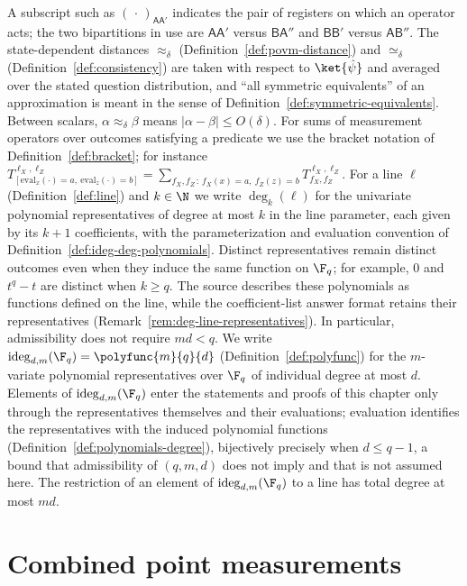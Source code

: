 A subscript such as $(\,\cdot\,)_{\mathsf{A}\mathsf{A}'}$ indicates the pair of
registers on which an operator acts; the two bipartitions in use are
$\mathsf{A}\mathsf{A}'$ versus $\mathsf{B}\mathsf{A}''$ and
$\mathsf{B}\mathsf{B}'$ versus $\mathsf{A}\mathsf{B}''$. The state-dependent
distances $\approx_\delta$ (Definition~\ref{def:povm-distance}) and
$\simeq_\delta$ (Definition~\ref{def:consistency}) are taken with respect to
$\ket{\hat\psi}$ and averaged over the stated question distribution, and
``all symmetric equivalents'' of an approximation is meant in the sense of
Definition~\ref{def:symmetric-equivalents}. Between scalars, $\alpha
\approx_\delta \beta$ means $|\alpha - \beta| \le O(\delta)$. For sums of
measurement operators over outcomes satisfying a predicate we use the bracket
notation of Definition~\ref{def:bracket}; for instance
$T^{\ell_X,\ell_Z}_{[\mathrm{eval}_x(\cdot)=a,\ \mathrm{eval}_z(\cdot)=b]}
= \sum_{f_X,f_Z \,:\, f_X(x)=a,\ f_Z(z)=b} T^{\ell_X,\ell_Z}_{f_X,f_Z}$.
For a line $\ell$ (Definition~\ref{def:line}) and $k \in \N$ we write
$\deg_k(\ell)$ for the univariate polynomial representatives of degree at most
$k$ in the line parameter, each given by its $k+1$ coefficients, with the
parameterization and evaluation convention of
Definition~\ref{def:ideg-deg-polynomials}. Distinct representatives remain
distinct outcomes even when they induce the same function on $\F_q$; for
example, $0$ and $t^q-t$ are distinct when $k\geq q$. The source describes
these polynomials as functions defined on the line, while the coefficient-list
answer format retains their representatives
(Remark~\ref{rem:deg-line-representatives}). In particular, admissibility
does not require $md<q$. We write
$\mathrm{ideg}_{d,m}(\F_q) = \polyfunc{m}{q}{d}$
(Definition~\ref{def:polyfunc}) for the $m$-variate polynomial representatives
over $\F_q$ of individual degree at most $d$. Elements of
$\mathrm{ideg}_{d,m}(\F_q)$ enter the statements and proofs of this chapter
only through the representatives themselves and their evaluations; evaluation
identifies the representatives with the induced polynomial functions
(Definition~\ref{def:polynomials-degree}), bijectively precisely when
$d \le q-1$, a bound that admissibility of $(q,m,d)$ does not imply and that
is not assumed here. The restriction of an element of
$\mathrm{ideg}_{d,m}(\F_q)$ to a line has total degree at most $md$.

\section{Combined point measurements}

